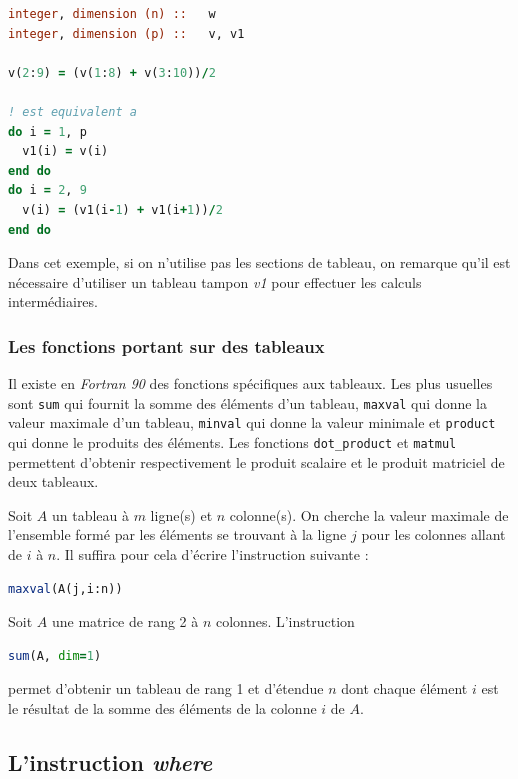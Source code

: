 \documentclass[a4paper,twoside]{article}
\begin{document}
\begin{lstlisting}[language=Fortran]
integer, dimension (n) ::   w
integer, dimension (p) ::   v, v1

v(2:9) = (v(1:8) + v(3:10))/2

! est equivalent a
do i = 1, p
  v1(i) = v(i)
end do
do i = 2, 9
  v(i) = (v1(i-1) + v1(i+1))/2
end do
\end{lstlisting}

Dans cet exemple, si on n'utilise pas les sections de tableau, on remarque qu'il est nécessaire d'utiliser un tableau tampon \emph{v1} pour effectuer les calculs intermédiaires. 

\subsubsection{Les fonctions portant sur des tableaux}

Il existe en \emph{Fortran 90} des fonctions spécifiques aux tableaux. Les plus usuelles sont \texttt{sum} qui fournit la somme des éléments d'un tableau, \texttt{maxval} qui donne la valeur maximale d'un tableau, \texttt{minval} qui donne la valeur minimale et \texttt{product} qui donne le produits des éléments. Les fonctions \texttt{dot\_product} et \texttt{matmul} permettent d'obtenir respectivement le produit scalaire et le produit matriciel de deux tableaux.

\begin{exemple}
Soit $A$ un tableau à $m$ ligne(s) et $n$ colonne(s). On cherche la valeur maximale de l'ensemble formé par les éléments se trouvant à la ligne $j$ pour les colonnes allant de $i$ à $n$. Il suffira pour cela d'écrire l'instruction suivante :
\begin{lstlisting}[language=Fortran]
maxval(A(j,i:n))
\end{lstlisting}

\bigskip

Soit $A$ une matrice de rang 2 à $n$ colonnes. L'instruction 
\begin{lstlisting}[language=Fortran]
sum(A, dim=1)
\end{lstlisting}
permet d'obtenir un tableau de rang 1 et d'étendue $n$ dont chaque élément $i$ est le résultat de la somme des éléments de la colonne $i$ de $A$.
\end{exemple}


\subsection{L'instruction \emph{where}}
\end{document}
